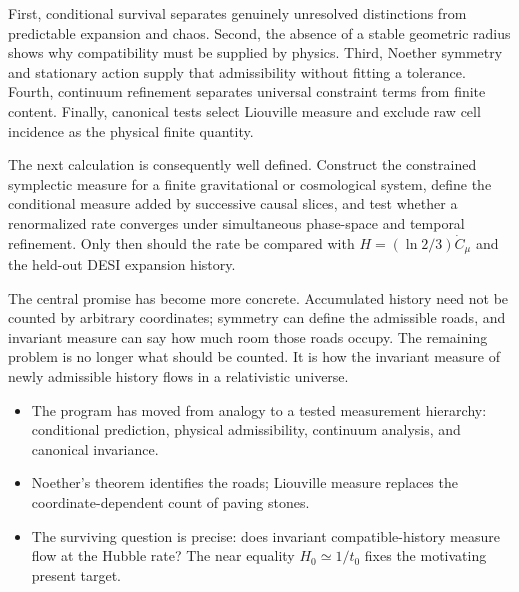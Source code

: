 \documentclass[10pt]{article}
\newenvironment{persuasions}
  {\begin{cpbox}\small\setlength{\parskip}{0pt}%
   {\footnotesize\bfseries\color{accent}%
    \textls[110]{CONCEPTUAL PERSUASIONS}}\par\vspace{3pt}%
   \begin{itemize}[leftmargin=1.15em,itemsep=2.5pt,topsep=0pt,parsep=0pt,
                   label=\textcolor{accent}{\scriptsize$\blacktriangleright$}]}
  {\end{itemize}\end{cpbox}}
\begin{document}
First, conditional survival separates genuinely unresolved distinctions from
predictable expansion and chaos.  Second, the absence of a stable geometric
radius shows why compatibility must be supplied by physics.  Third, Noether
symmetry and stationary action supply that admissibility without fitting a
tolerance.  Fourth, continuum refinement separates universal constraint terms
from finite content.  Finally, canonical tests select Liouville measure and
exclude raw cell incidence as the physical finite quantity.

The next calculation is consequently well defined.  Construct the constrained
symplectic measure for a finite gravitational or cosmological system, define
the conditional measure added by successive causal slices, and test whether a
renormalized rate converges under simultaneous phase-space and temporal
refinement.  Only then should the rate be compared with
$H=(\ln2/3)\dot C_\mu$ and the held-out DESI expansion history.

The central promise has become more concrete.  Accumulated history need not be
counted by arbitrary coordinates; symmetry can define the admissible roads,
and invariant measure can say how much room those roads occupy.  The remaining
problem is no longer what should be counted.  It is how the invariant measure
of newly admissible history flows in a relativistic universe.

\begin{persuasions}
\item The program has moved from analogy to a tested measurement hierarchy:
conditional prediction, physical admissibility, continuum analysis, and
canonical invariance.
\item Noether's theorem identifies the roads; Liouville measure replaces the
coordinate-dependent count of paving stones.
\item The surviving question is precise: does invariant compatible-history
measure flow at the Hubble rate?  The near equality $H_0\simeq1/t_0$ fixes the
motivating present target.
\end{persuasions}



\end{document}
